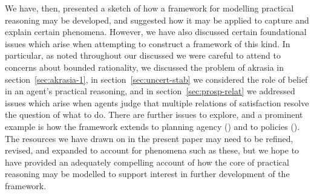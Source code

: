 \documentclass[10pt]{article}
\begin{document}
We have, then, presented a sketch of how a framework for modelling practical reasoning may be developed, and suggested how it may be applied to capture and explain certain phenomena.
However, we have also discussed certain foundational issues which arise when attempting to construct a framework of this kind.
In particular, as noted throughout our discussed we were careful to attend to concerns about bounded rationality, we discussed the problem of akrasia in section~\ref{sec:akrasia-1}, in section~\ref{sec:uncert-stab} we considered the role of belief in an agent's practical reasoning, and in section~\ref{sec:prosp-relat} we addressed issues which arise when agents judge that multiple relations of satisfaction resolve the question of what to do.
There are further issues to explore, and a prominent example is how the framework extends to planning agency (\cite[cf.][]{Bratman:1987aa}) and to policies (\cite[cf.][]{Bratman:1989aa,Tenenbaum:2016aa}).
The resources we have drawn on in the present paper may need to be refined, revised, and expanded to account for phenomena such as these, but we hope to have provided an adequately compelling account of how the core of practical reasoning may be modelled to support interest in further development of the framework.


\singlespacing
\vfill
\newpage
\nocite{Bratman:1979aa,Bratman:1987aa,Bratman:1989aa,Bratman:2014aa,Bratman:2017ad,Bratman:2018aa,Bratman:2018ab,Broadie:2002aa,Friston:2015aa,Gerd-Gigerenzer:2002aa,Icard:2014ab,Scanlon:1998aa,Simon:1955aa,Simon:1957aa,Simon:1997aa,Sinhababu:2013aa}
\printbibliography


\end{document}
